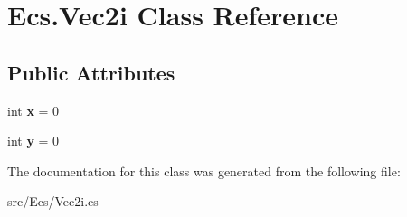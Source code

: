 \hypertarget{class_ecs_1_1_vec2i}{}\section{Ecs.\+Vec2i Class Reference}
\label{class_ecs_1_1_vec2i}
\subsection*{Public Attributes}
\begin{DoxyCompactItemize}
\item 
\mbox{\label{class_ecs_1_1_vec2i_a0b75ea4681707fb669f5539e69bb1917}} 
int {\bfseries x} = 0
\item 
\mbox{\label{class_ecs_1_1_vec2i_a3e167ee73ce5f7e73be9d2e70fcf4f36}} 
int {\bfseries y} = 0
\end{DoxyCompactItemize}


The documentation for this class was generated from the following file\+:\begin{DoxyCompactItemize}
\item 
src/\+Ecs/Vec2i.\+cs\end{DoxyCompactItemize}
